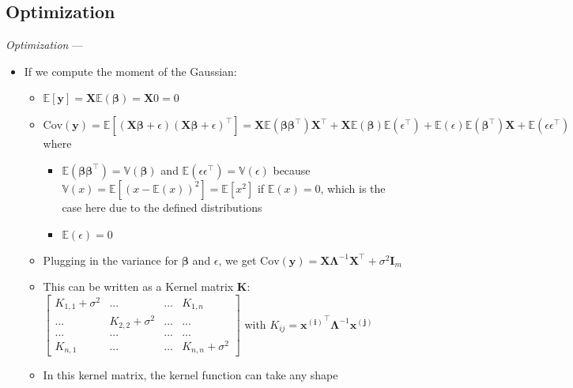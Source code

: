 \subsection*{Optimization}
\emph{Optimization} --- 
\begin{itemize}
    \item If we compute the moment of the Gaussian:
    \begin{itemize}
        \item $\mathbb{E}[\boldsymbol{y}] = \boldsymbol{X} \mathbb{E}(\boldsymbol{\beta}) =  \boldsymbol{X} 0 = 0$
        \item $\textrm{Cov}(\boldsymbol{y}) = \mathbb{E} [ (\boldsymbol{X} \boldsymbol{\beta} + \epsilon) ( 
        \boldsymbol{X} \boldsymbol{\beta} + \epsilon )^\intercal ] = \boldsymbol{X} \mathbb{E}(\boldsymbol{\beta} \boldsymbol{\beta}^\intercal) \boldsymbol{X}^\intercal + \boldsymbol{X} \mathbb{E}(\boldsymbol{\beta}) \mathbb{E}(\epsilon^\intercal) + \mathbb{E}(\epsilon) \mathbb{E}(\boldsymbol{\beta}^\intercal) \boldsymbol{X} + \mathbb{E}(\epsilon \epsilon^\intercal)$ where
        \begin{itemize}
            \item $\mathbb{E}(\boldsymbol{\beta} \boldsymbol{\beta}^\intercal) = \mathbb{V}(\boldsymbol{\beta})$ and $\mathbb{E}(\epsilon \epsilon^\intercal) = \mathbb{V}(\epsilon)$ because $\mathbb{V}(x) = \mathbb{E}[(x-\mathbb{E}(x))^2] = \mathbb{E}[x^2]$ if $\mathbb{E}(x) = 0$, which is the case here due to the defined distributions
            \item $\mathbb{E}(\epsilon) = 0$ 
        \end{itemize}
        \item Plugging in the variance for $\boldsymbol{\beta}$ and $\epsilon$, we get $\textrm{Cov}(\boldsymbol{y}) = \boldsymbol{X} \boldsymbol{\Lambda}^{-1} \boldsymbol{X}^\intercal + \sigma^2 \boldsymbol{I}_m $
        \item This can be written as a Kernel matrix $\boldsymbol{K}$:
        $\begin{bmatrix}
        K_{1,1} + \sigma^2 & ... & ... & K_{1,n} \\
        ... & K_{2,2} + \sigma^2 & ... & ... \\
        ... & ... & ... & ... \\
        K_{n,1} & ... & ... & K_{n,n} + \sigma^2
        \end{bmatrix}$ with $K_{ij} = \boldsymbol{x^{(i)}}^\intercal \boldsymbol{\Lambda}^{-1} \boldsymbol{x^{(j)}}$
        \item In this kernel matrix, the kernel function can take any shape

\end{itemize}
\end{itemize}

